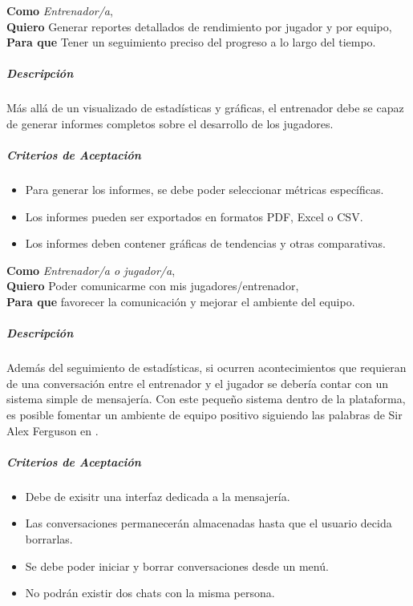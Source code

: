 \begin{tcolorbox}[title=Historia de Usuario 7: Análisis y Reportes Detallados]
\textbf{Como} \textit{Entrenador/a},\\
\textbf{Quiero} Generar reportes detallados de rendimiento por jugador y por equipo,\\
\textbf{Para que} Tener un seguimiento preciso del progreso a lo largo del tiempo.
\end{tcolorbox}

\subparagraph{Descripción}
Más allá de un visualizado de estadísticas y gráficas, el entrenador debe se capaz de generar informes completos sobre el desarrollo de los jugadores.

\subparagraph{Criterios de Aceptación}
\begin{itemize}
    \item Para generar los informes, se debe poder seleccionar métricas específicas.
    \item Los informes pueden ser exportados en formatos PDF, Excel o CSV.
    \item Los informes deben contener gráficas de tendencias y otras comparativas.
\end{itemize}

\begin{tcolorbox}[title=Historia de Usuario 8: Sistema de comunicación]
\textbf{Como} \textit{Entrenador/a o jugador/a},\\
\textbf{Quiero} Poder comunicarme con mis jugadores/entrenador,\\
\textbf{Para que} favorecer la comunicación y mejorar el ambiente del equipo.
\end{tcolorbox}

\subparagraph{Descripción}
Además del seguimiento de estadísticas, si ocurren acontecimientos que requieran de una conversación entre el entrenador y el jugador se debería contar con un sistema simple de mensajería. Con este pequeño sistema dentro de la plataforma, es posible fomentar un ambiente de equipo positivo siguiendo las palabras de Sir Alex Ferguson en \cite{TheGuardian} .

\subparagraph{Criterios de Aceptación}
\begin{itemize}
    \item Debe de exisitr una interfaz dedicada a la mensajería.
    \item Las conversaciones permanecerán almacenadas hasta que el usuario decida borrarlas.
    \item Se debe poder iniciar y borrar conversaciones desde un menú.
    \item No podrán existir dos chats con la misma persona.
\end{itemize}



